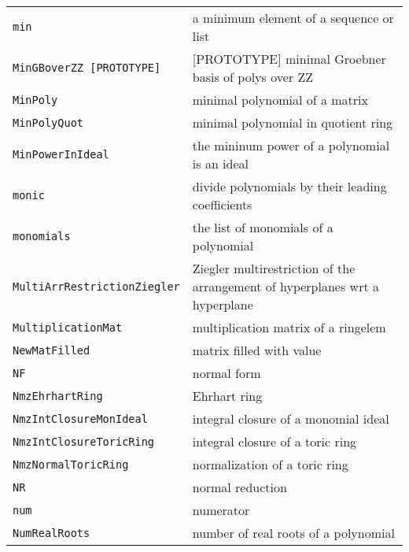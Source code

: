 \documentclass[a4paper]{mybook}
\begin{document}
\begin{center}
\begin{longtable}{ll}
{\verb~min~} &
      a minimum element of a sequence or list\\
   
{\verb~MinGBoverZZ [PROTOTYPE]~} &
      [PROTOTYPE] minimal Groebner basis of polys over ZZ\\
   
{\verb~MinPoly~} &
      minimal polynomial of a matrix\\
   
{\verb~MinPolyQuot~} &
      minimal polynomial in quotient ring\\
   
{\verb~MinPowerInIdeal~} &
      the mininum power of a polynomial is an ideal\\
   
{\verb~monic~} &
      divide polynomials by their leading coefficients\\
   
{\verb~monomials~} &
      the list of monomials of a polynomial\\
   
{\verb~MultiArrRestrictionZiegler~} &
      Ziegler multirestriction of the arrangement of hyperplanes  wrt a hyperplane\\
   
{\verb~MultiplicationMat~} &
      multiplication matrix of a ringelem\\
   
{\verb~NewMatFilled~} &
      matrix filled with value\\
   
{\verb~NF~} &
      normal form\\
   
{\verb~NmzEhrhartRing~} &
      Ehrhart ring\\
   
{\verb~NmzIntClosureMonIdeal~} &
      integral closure of a monomial ideal\\
   
{\verb~NmzIntClosureToricRing~} &
      integral closure of a toric ring\\
   
{\verb~NmzNormalToricRing~} &
      normalization of a toric ring\\
   
{\verb~NR~} &
      normal reduction\\
   
{\verb~num~} &
      numerator\\
   
{\verb~NumRealRoots~} &
      number of real roots of a polynomial\\
   

\end{longtable}
\end{center}
\end{document}
